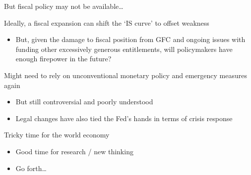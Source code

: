 \begin{frame}{But fiscal policy may not be available\ldots}

Ideally, a fiscal expansion can shift the `IS curve' to offset weakness
\begin{itemize}
\item	But, given the damage to fiscal position from GFC and ongoing issues with funding other excessively generous entitlements, will policymakers have enough firepower in the future?
\vspace{3mm}
\end{itemize}
\vspace{2mm}
Might need to rely on unconventional monetary policy and emergency measures again
	\begin{itemize}
	\item	But still controversial and poorly understood
	\item	Legal changes have also tied the Fed's hands in terms of crisis response
	\end{itemize}
\vspace{2mm}
Tricky time for the world economy
\begin{itemize}
\item	Good time for research / new thinking
\item	Go forth\ldots
\end{itemize}

\end{frame}
